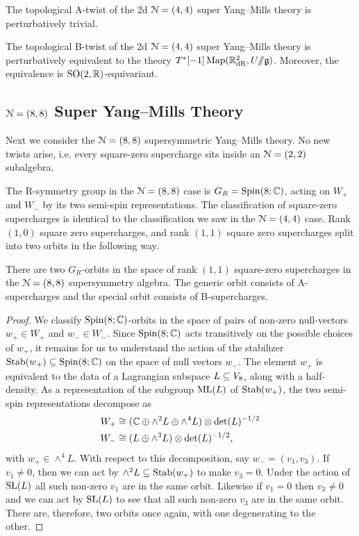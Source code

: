 \documentclass[10pt, oneside]{article}
\begin{document}
\begin{corollary}
The topological A-twist of the 2d $\mathcal N=(4, 4)$ super Yang--Mills theory is perturbatively trivial.
\label{cor:2d44Atwist}
\end{corollary}

\begin{corollary}
The topological B-twist of the 2d $\mathcal N=(4, 4)$ super Yang--Mills theory is perturbatively equivalent to the theory $T^*[-1]\operatorname{Map}(\mathbb R^2_{\mathrm{dR}}, U/\!\!/ \mathfrak g)$. Moreover, the equivalence is $\mathrm{SO}(2, \mathbb R)$-equivariant.
\label{cor:2d44Btwist}
\end{corollary}

\subsection{\texorpdfstring{$\mathcal N=(8,8)$}{N=(8,8)} Super Yang--Mills Theory} \label{sect:2d(8,8)}
Next we consider the $\mathcal{N}=(8,8)$ supersymmetric Yang--Mills theory.
No new twists arise, i.e. every square-zero supercharge sits inside an $\mathcal{N}=(2,2)$ subalgebra.

The R-symmetry group in the $\mathcal{N}=(8,8)$ case is $G_R = \mathrm{Spin}(8;\mathbb C)$, acting on $W_+$ and $W_-$ by its two semi-spin representations.  The classification of square-zero supercharges is identical to the classification we saw in the $\mathcal{N}=(4,4)$ case.  Rank $(1,0)$ square zero supercharges, and rank $(1,1)$ square zero supercharges split into two orbits in the following way.

\begin{prop}
There are two $G_R$-orbits in the space of rank $(1,1)$ square-zero supercharges in the $\mathcal{N}=(8,8)$ supersymmetry algebra. The generic orbit consists of A-supercharges and the special orbit consists of B-supercharges.
\end{prop}

\begin{proof}
We classify $\mathrm{Spin}(8;\mathbb C)$-orbits in the space of pairs of non-zero null-vectors $w_+ \in W_+$ and $w_- \in W_-$.  Since $\mathrm{Spin}(8;\mathbb C)$ acts transitively on the possible choices of $w_+$, it remains for us to understand the action of the stabilizer $\operatorname{Stab}(w_+) \subseteq \mathrm{Spin}(8;\mathbb C)$ on the space of null vectors $w_-$.  The element $w_+$ is equivalent to the data of a Lagrangian subspace $L \subseteq V_8$, along with a half-density.  As a representation of the subgroup $\mathrm{ML}(L)$ of $\operatorname{Stab}(w_+)$, the two semi-spin representations decompose as
\begin{align*}
 W_+ &\cong (\mathbb C \oplus \wedge^2 L \oplus \wedge^4 L) \otimes \det(L)^{-1/2} \\
 W_- &\cong (L \oplus \wedge^3 L) \otimes \det(L)^{-1/2},
\end{align*}
with $w_+ \in \wedge^4 L$.  With respect to this decomposition, say $w_- = (v_1,v_3)$.  If $v_1 \ne 0$, then we can act by $\wedge^2 L \subseteq \operatorname{Stab}(w_+)$ to make $v_3 = 0$.  Under the action of $\mathrm{SL}(L)$ all such non-zero $v_1$ are in the same orbit.  Likewise if $v_1 = 0$ then $v_3 \ne 0$ and we can act by $\mathrm{SL}(L)$ to see that all such non-zero $v_3$ are in the same orbit.  There are, therefore, two orbits once again, with one degenerating to the other.
\end{proof}
\end{document}
